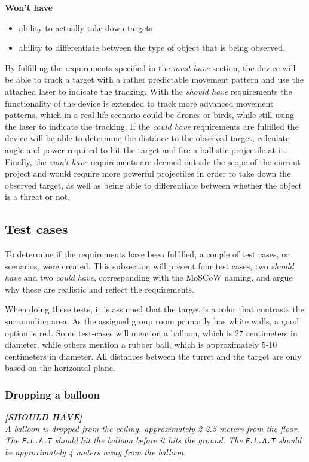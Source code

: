 \textbf{Won't have}
\begin{itemize}
	\item ability to actually take down targets
	\item ability to differentiate between the type of object that is being observed.
\end{itemize}

By fulfilling the requirements specified in the \textit{must have} section, the device will be able to track a target with a rather predictable movement pattern and use the attached laser to indicate the tracking.
With the \textit{should have} requirements the functionality of the device is extended to track more advanced movement patterns, which in a real life scenario could be drones or birds, while still using the laser to indicate the tracking.
If the \textit{could have} requirements are fulfilled the device will be able to determine the distance to the observed target, calculate angle and power required to hit the target and fire a ballistic projectile at it.
Finally, the \textit{won't have} requirements are deemed outside the scope of the current project and would require more powerful projectiles in order to take down the observed target, as well as being able to differentiate between whether the object is a threat or not.

\subsection{Test cases}
To determine if the requirements have been fulfilled, a couple of test cases, or scenarios, were created.
This subsection will present four test cases, two \textit{should have} and two \textit{could have}, corresponding with the MoSCoW naming, and argue why these are realistic and reflect the requirements.

When doing these tests, it is assumed that the target is a color that contrasts the surrounding area.
As the assigned group room primarily has white walls, a good option is red.
Some test-cases will mention a balloon, which is 27 centimeters in diameter, while others mention a rubber ball, which is approximately 5-10 centimeters in diameter.
All distances between the turret and the target are only based on the horizontal plane.

\subsubsection{Dropping a balloon}
\textit{\textbf{[SHOULD HAVE]}}\\
\textit{A balloon is dropped from the ceiling, approximately 2-2.5 meters from the floor.
The \texttt{F.L.A.T} should hit the balloon before it hits the ground.
The \texttt{F.L.A.T} should be approximately 4 meters away from the balloon.}

